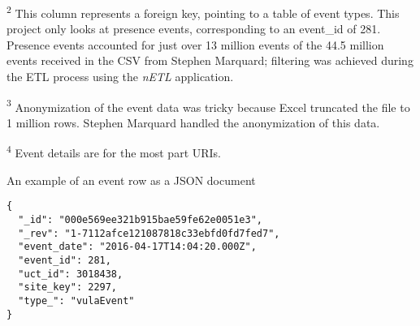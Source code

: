 \begin{table}[H]
\begin{threeparttable}
\begin{tablenotes}
            \item[\textsuperscript{2}]This column represents a foreign key, pointing to a table of event types. This project only looks at presence events, corresponding to an event\_id of 281. Presence events accounted for just over 13 million events of the 44.5 million events received in the CSV from Stephen Marquard; filtering was achieved during the ETL process using the \textit{nETL} application.
            \item[\textsuperscript{3}]Anonymization of the event data was tricky because Excel truncated the file to 1 million rows. Stephen Marquard handled the anonymization of this data.
            \item[\textsuperscript{4}]Event details are for the most part URIs.
        \end{tablenotes}
    \end{threeparttable}
\end{table}

An example of an event row as a JSON document
\begin{verbatim}
{
  "_id": "000e569ee321b915bae59fe62e0051e3",
  "_rev": "1-7112afce121087818c33ebfd0fd7fed7",
  "event_date": "2016-04-17T14:04:20.000Z",
  "event_id": 281,
  "uct_id": 3018438,
  "site_key": 2297,
  "type_": "vulaEvent"
}
\end{verbatim}


